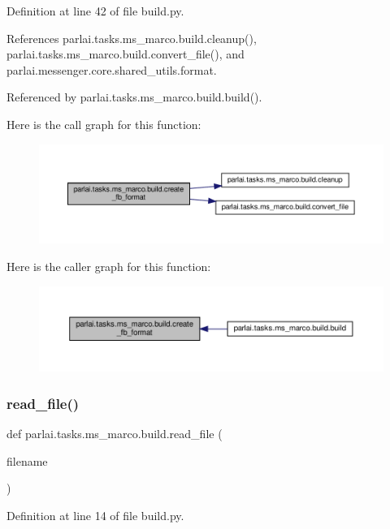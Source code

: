 Definition at line 42 of file build.\+py.



References parlai.\+tasks.\+ms\+\_\+marco.\+build.\+cleanup(), parlai.\+tasks.\+ms\+\_\+marco.\+build.\+convert\+\_\+file(), and parlai.\+messenger.\+core.\+shared\+\_\+utils.\+format.



Referenced by parlai.\+tasks.\+ms\+\_\+marco.\+build.\+build().

Here is the call graph for this function\+:
\nopagebreak
\begin{figure}[H]
\begin{center}
\leavevmode
\includegraphics[width=350pt]{namespaceparlai_1_1tasks_1_1ms__marco_1_1build_ac3cdd4cc2ccd3e9551ddd0349b94d537_cgraph}
\end{center}
\end{figure}
Here is the caller graph for this function\+:
\nopagebreak
\begin{figure}[H]
\begin{center}
\leavevmode
\includegraphics[width=350pt]{namespaceparlai_1_1tasks_1_1ms__marco_1_1build_ac3cdd4cc2ccd3e9551ddd0349b94d537_icgraph}
\end{center}
\end{figure}
\mbox{\label{namespaceparlai_1_1tasks_1_1ms__marco_1_1build_a8e7fee7824a3a7aa1facadf9979f3f4a}} 
\subsubsection{\texorpdfstring{read\+\_\+file()}{read\_file()}}
{\footnotesize\ttfamily def parlai.\+tasks.\+ms\+\_\+marco.\+build.\+read\+\_\+file (\begin{DoxyParamCaption}\item[{}]{filename }\end{DoxyParamCaption})}



Definition at line 14 of file build.\+py.

